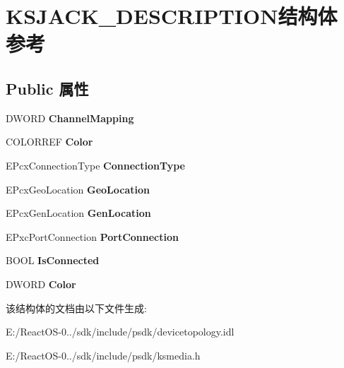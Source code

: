 \hypertarget{struct_k_s_j_a_c_k___d_e_s_c_r_i_p_t_i_o_n}{}\section{K\+S\+J\+A\+C\+K\+\_\+\+D\+E\+S\+C\+R\+I\+P\+T\+I\+O\+N结构体 参考}
\label{struct_k_s_j_a_c_k___d_e_s_c_r_i_p_t_i_o_n}
\subsection*{Public 属性}
\begin{DoxyCompactItemize}
\item 
\mbox{\label{struct_k_s_j_a_c_k___d_e_s_c_r_i_p_t_i_o_n_aa1e44668e22712023045dbff11a5e5fe}} 
D\+W\+O\+RD {\bfseries Channel\+Mapping}
\item 
\mbox{\label{struct_k_s_j_a_c_k___d_e_s_c_r_i_p_t_i_o_n_aa843c17518cd95420e28177647548e11}} 
C\+O\+L\+O\+R\+R\+EF {\bfseries Color}
\item 
\mbox{\label{struct_k_s_j_a_c_k___d_e_s_c_r_i_p_t_i_o_n_a4912c3ca11ce94f3b88606dbc346d711}} 
E\+Pcx\+Connection\+Type {\bfseries Connection\+Type}
\item 
\mbox{\label{struct_k_s_j_a_c_k___d_e_s_c_r_i_p_t_i_o_n_aa9295786f7e992d8f4db02d43bbdfc17}} 
E\+Pcx\+Geo\+Location {\bfseries Geo\+Location}
\item 
\mbox{\label{struct_k_s_j_a_c_k___d_e_s_c_r_i_p_t_i_o_n_ae906bb4ae773b628f2906d16b0daa2b3}} 
E\+Pcx\+Gen\+Location {\bfseries Gen\+Location}
\item 
\mbox{\label{struct_k_s_j_a_c_k___d_e_s_c_r_i_p_t_i_o_n_a8404a8021c3738727574ab02da9b70b2}} 
E\+Pxc\+Port\+Connection {\bfseries Port\+Connection}
\item 
\mbox{\label{struct_k_s_j_a_c_k___d_e_s_c_r_i_p_t_i_o_n_a0840c033bb5af29e583a0edb0bbacc35}} 
B\+O\+OL {\bfseries Is\+Connected}
\item 
\mbox{\label{struct_k_s_j_a_c_k___d_e_s_c_r_i_p_t_i_o_n_a919055abc718d386b544911b03ad3ce9}} 
D\+W\+O\+RD {\bfseries Color}
\end{DoxyCompactItemize}


该结构体的文档由以下文件生成\+:\begin{DoxyCompactItemize}
\item 
E\+:/\+React\+O\+S-\/0../sdk/include/psdk/devicetopology.\+idl\item 
E\+:/\+React\+O\+S-\/0../sdk/include/psdk/ksmedia.\+h\end{DoxyCompactItemize}
